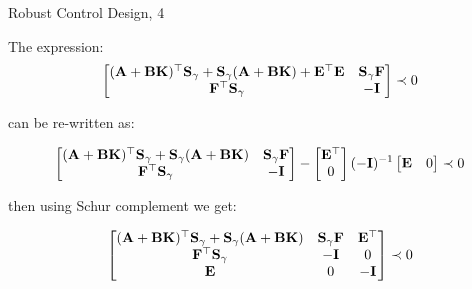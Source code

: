 \documentclass{beamer}
\begin{document}
\begin{frame}{Robust Control Design, 4}
	\begin{flushleft}
		
		The expression:
		$$\begin{bmatrix}
			(\mathbf{A} + \mathbf{B}\mathbf{K})^\top\mathbf{S}_\gamma + \mathbf{S}_\gamma (\mathbf{A} + \mathbf{B}\mathbf{K}) + \mathbf{E}^\top \mathbf{E} & \mathbf{S}_\gamma\mathbf{F} \\
			\mathbf{F}^\top\mathbf{S}_\gamma & -\mathbf{I}
		\end{bmatrix} \prec 0$$ 
		
		can be re-written as:
		
		\begin{equation*}
			\begin{bmatrix}
				(\mathbf{A} + \mathbf{B}\mathbf{K})^\top\mathbf{S}_\gamma + \mathbf{S}_\gamma (\mathbf{A} + \mathbf{B}\mathbf{K}) & \mathbf{S}_\gamma\mathbf{F} \\
				\mathbf{F}^\top\mathbf{S}_\gamma & -\mathbf{I}
			\end{bmatrix} 
			-
			\begin{bmatrix}
				\mathbf{E}^\top \\
				0
			\end{bmatrix} 
			(-\mathbf{I})^{-1}
			\begin{bmatrix}
				\mathbf{E} & 0
			\end{bmatrix} 
			\prec 0
		\end{equation*}		
		
		then using Schur complement we get:
		
		\begin{equation}
			\begin{bmatrix}
				(\mathbf{A} + \mathbf{B}\mathbf{K})^\top\mathbf{S}_\gamma + \mathbf{S}_\gamma (\mathbf{A} + \mathbf{B}\mathbf{K}) & \mathbf{S}_\gamma\mathbf{F} & \mathbf{E}^\top \\
				\mathbf{F}^\top\mathbf{S}_\gamma & -\mathbf{I} & 0 \\
				\mathbf{E} & 0 & -\mathbf{I}
			\end{bmatrix} 
			\prec 0
		\end{equation}	
		
		
	\end{flushleft}
\end{frame}
\end{document}
